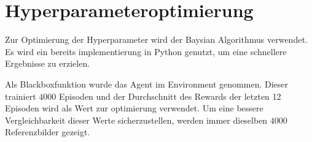 \section{Hyperparameteroptimierung}
\label{chap:Hyperparameter Optimierung}
Zur Optimierung der Hyperparameter wird der Baysian Algorithmus verwendet. Es
wird ein bereits implementierung in Python genutzt, um eine schnellere
Ergebnisse zu erzielen. \cite{fernando_bayesian_2022}

Als Blackboxfunktion wurde das Agent im Environment genommen. Dieser trainiert
$4000$ Episoden und der Durchschnitt des Rewards der letzten 12 Episoden wird
als Wert zur optimierung verwendet. Um eine bessere Vergleichbarkeit dieser
Werte sicherzustellen, werden immer dieselben $4000$ Referenzbilder gezeigt.
